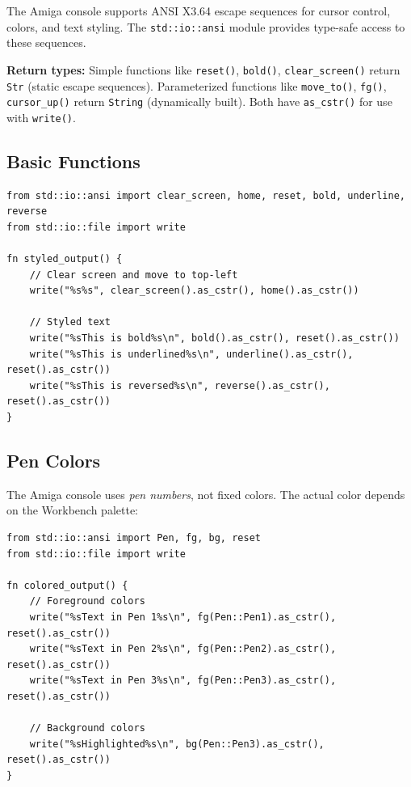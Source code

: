 The Amiga console supports ANSI X3.64 escape sequences for cursor control, colors, and text styling. The \texttt{std::io::ansi} module provides type-safe access to these sequences.

\begin{notebox}
\textbf{Return types:} Simple functions like \texttt{reset()}, \texttt{bold()}, \texttt{clear\_screen()} return \texttt{Str} (static escape sequences). Parameterized functions like \texttt{move\_to()}, \texttt{fg()}, \texttt{cursor\_up()} return \texttt{String} (dynamically built). Both have \texttt{as\_cstr()} for use with \texttt{write()}.
\end{notebox}

\subsection{Basic Functions}

\begin{lstlisting}
from std::io::ansi import clear_screen, home, reset, bold, underline, reverse
from std::io::file import write

fn styled_output() {
    // Clear screen and move to top-left
    write("%s%s", clear_screen().as_cstr(), home().as_cstr())

    // Styled text
    write("%sThis is bold%s\n", bold().as_cstr(), reset().as_cstr())
    write("%sThis is underlined%s\n", underline().as_cstr(), reset().as_cstr())
    write("%sThis is reversed%s\n", reverse().as_cstr(), reset().as_cstr())
}
\end{lstlisting}

\subsection{Pen Colors}

The Amiga console uses \emph{pen numbers}, not fixed colors. The actual color depends on the Workbench palette:

\begin{lstlisting}
from std::io::ansi import Pen, fg, bg, reset
from std::io::file import write

fn colored_output() {
    // Foreground colors
    write("%sText in Pen 1%s\n", fg(Pen::Pen1).as_cstr(), reset().as_cstr())
    write("%sText in Pen 2%s\n", fg(Pen::Pen2).as_cstr(), reset().as_cstr())
    write("%sText in Pen 3%s\n", fg(Pen::Pen3).as_cstr(), reset().as_cstr())

    // Background colors
    write("%sHighlighted%s\n", bg(Pen::Pen3).as_cstr(), reset().as_cstr())
}
\end{lstlisting}

